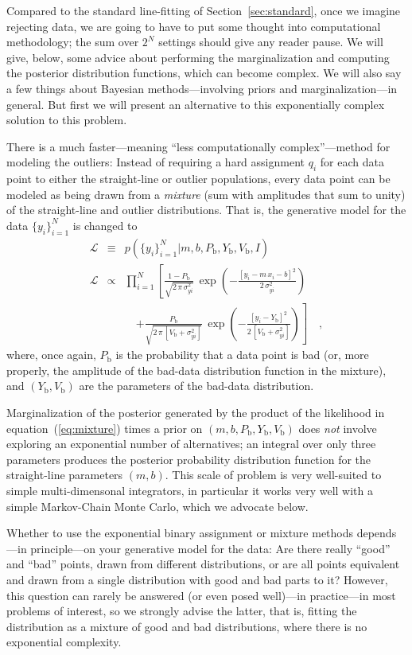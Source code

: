 \documentclass[12pt,twoside]{article}
\newcommand{\sectionname}{Section}
\newcommand{\equationname}{equation}
\newcounter{problem}
\newcommand{\setofall}[3]{\{{#1}\}_{{#2}}^{{#3}}}
\newcommand{\ally}{\setofall{y_i}{i=1}{N}}
\newcommand{\like}{\mathscr{L}}
\newcommand{\Pbad}{P_{\mathrm{b}}}
\newcommand{\Ybad}{Y_{\mathrm{b}}}
\newcommand{\Vbad}{V_{\mathrm{b}}}
\begin{document}
Compared to the standard line-fitting of
\sectionname~\ref{sec:standard}, once we imagine rejecting data, we
are going to have to put some thought into computational methodology;
the sum over $2^N$ settings should give any reader pause.  We will
give, below, some advice about performing the marginalization and
computing the posterior distribution functions, which can become
complex.  We will also say a few things about Bayesian
methods---involving priors and marginalization---in general.  But
first we will present an alternative to this exponentially complex
solution to this problem.

There is a much faster---meaning ``less computationally
complex''---method for modeling the outliers: Instead of requiring a
hard assignment $q_i$ for each data point to either the straight-line
or outlier populations, every data point can be modeled as being drawn
from a \emph{mixture} (sum with amplitudes that sum to unity) of the
straight-line and outlier distributions.  That is, the generative
model for the data $\ally$ is changed to
\begin{eqnarray}\label{eq:mixture}\displaystyle
\like &\equiv& p(\ally|m,b,\Pbad,\Ybad,\Vbad,I)
 \nonumber\\
\like &\propto&
 \prod_{i=1}^N \left[\frac{1-\Pbad}{\sqrt{2\,\pi\,\sigma_{yi}^2}}
 \,\exp\left(-\frac{[y_i-m\,x_i-b]^2}{2\,\sigma_{yi}^2}\right)\right.
 \nonumber \\ & & \quad
 \left.+ \frac{\Pbad}{\sqrt{2\,\pi\,[\Vbad+\sigma_{yi}^2]}}
 \,\exp\left(-\frac{[y_i-\Ybad]^2}{2\,[\Vbad+\sigma_{yi}^2]}\right)\right]
 \quad ,
\end{eqnarray}
where, once again, $\Pbad$ is the probability that a data point is bad
(or, more properly, the amplitude of the bad-data distribution
function in the mixture), and $(\Ybad,\Vbad)$ are the parameters of
the bad-data distribution.

Marginalization of the posterior generated by the product of the
likelihood in \equationname~(\ref{eq:mixture}) times a prior on
$(m,b,\Pbad,\Ybad,\Vbad)$ does \emph{not} involve exploring an
exponential number of alternatives; an integral over only three
parameters produces the posterior probability distribution function
for the straight-line parameters $(m,b)$.  This scale of problem is
very well-suited to simple multi-dimensonal integrators, in particular
it works very well with a simple Markov-Chain Monte Carlo, which we
advocate below.

Whether to use the exponential binary assignment or mixture methods
depends---in principle---on your generative model for the data: Are
there really ``good'' and ``bad'' points, drawn from different
distributions, or are all points equivalent and drawn from a single
distribution with good and bad parts to it?  However, this question
can rarely be answered (or even posed well)---in practice---in most
problems of interest, so we strongly advise the latter, that is,
fitting the distribution as a mixture of good and bad distributions,
where there is no exponential complexity.
\end{document}
